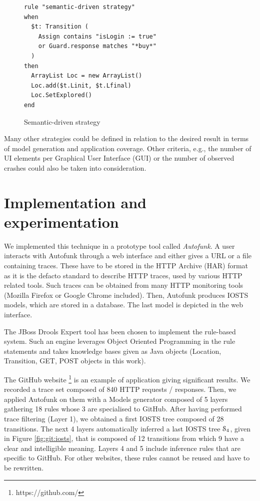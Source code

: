 \begin{figure}[h]
\begin{framed}
\begin{BVerbatim}
rule "semantic-driven strategy"
when
  $t: Transition (
    Assign contains "isLogin := true"
    or Guard.response matches "*buy*"
  )
then
  ArrayList Loc = new ArrayList()
  Loc.add($t.Linit, $t.Lfinal)
  Loc.SetExplored()
end
\end{BVerbatim}
\end{framed}

\caption{Semantic-driven strategy}
\label{fig:rule:semdriven}
\end{figure}

Many other strategies could be defined in relation to the desired
result in terms of model generation and application coverage.
Other criteria, e.g., the number of UI elements per Graphical User
Interface (GUI) or the number of observed crashes could also be
taken into consideration.


\section{Implementation and experimentation}
\label{sec:modelinf:webapps:exp}

We implemented this technique in a prototype tool called
\textit{Autofunk}. A user interacts with Autofunk through a web
interface and either gives a URL  or a file containing traces.
These have to be stored in the HTTP Archive (HAR) format as it is
the defacto standard to describe HTTP traces, used by various
HTTP related tools. Such traces can be obtained from many HTTP
monitoring tools (Mozilla Firefox or Google Chrome included).
Then, Autofunk produces IOSTS models, which are stored in a
database. The last model is depicted in the web interface.

The JBoss Drools Expert tool has been chosen to implement the
rule-based system. Such an engine leverages Object Oriented
Programming in the rule statements and takes knowledge bases
given as Java objects (Location, Transition, GET, POST objects in
this work).

The GitHub website \footnote{https://github.com/} is an example
of application giving significant results. We recorded a trace
set composed of 840 HTTP requests / responses. Then, we applied
Autofunk on them with a Models generator composed of 5 layers
gathering 18 rules whose 3 are specialised to GitHub. After
having performed trace filtering (Layer 1), we obtained a first
IOSTS tree composed of 28 transitions. The next 4 layers
automatically inferred a last IOSTS tree $\EuScript{S}_4$, given
in Figure \ref{fig:git:iosts}, that is composed of 12 transitions
from which 9 have a clear and intelligible meaning. Layers 4 and
5 include inference rules that are specific to GitHub. For other
websites, these rules cannot be reused and have to be rewritten.

